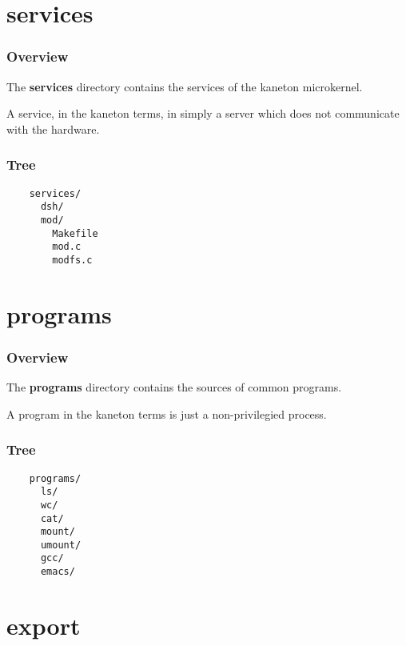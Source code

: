%
%

\section{services}


\begin{frame}
  \frametitle{Overview}

  The \textbf{services} directory contains the services of the kaneton
  microkernel.

  \nl

  A service, in the kaneton terms, in simply a server which does not
  communicate with the hardware.
\end{frame}


\begin{frame}[containsverbatim]
  \frametitle{Tree}

  \begin{verbatim}
    services/
      dsh/
      mod/
        Makefile
        mod.c
        modfs.c
  \end{verbatim}
\end{frame}

%
%

\section{programs}


\begin{frame}
  \frametitle{Overview}

  The \textbf{programs} directory contains the sources of common
  programs.

  \nl

  A program in the kaneton terms is just a non-privilegied
  process.
\end{frame}


\begin{frame}[containsverbatim]
  \frametitle{Tree}

  \begin{verbatim}
    programs/
      ls/
      wc/
      cat/
      mount/
      umount/
      gcc/
      emacs/
  \end{verbatim}
\end{frame}

%
%

\section{export}


